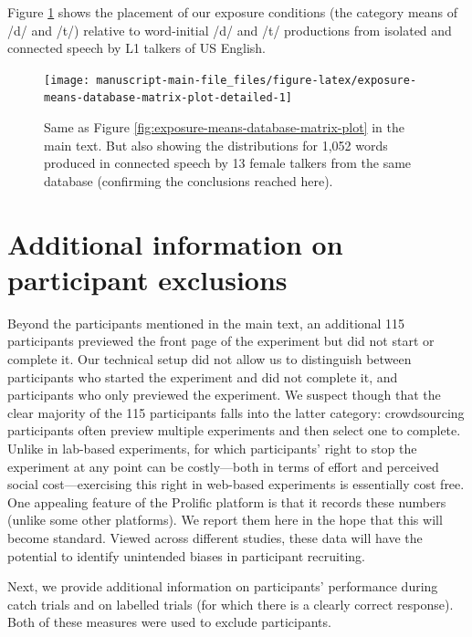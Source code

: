 \documentclass[
  11pt,
  man,mask,floatsintext]{apa6}
\begin{document}
Figure \ref{fig:exposure-means-database-matrix-plot-detailed} shows the placement of our exposure conditions (the category means of /d/ and /t/) relative to word-initial /d/ and /t/ productions from isolated and connected speech by L1 talkers of US English.



\begin{figure}[!ht]

{\centering \texttt{[image: manuscript-main-file\_files/figure-latex/exposure-means-database-matrix-plot-detailed-1]} 

}

\caption{Same as Figure \ref{fig:exposure-means-database-matrix-plot} in the main text. But also showing the distributions for 1,052 words produced in connected speech by 13 female talkers from the same database (confirming the conclusions reached here).}\label{fig:exposure-means-database-matrix-plot-detailed}
\end{figure}

\section{Additional information on participant exclusions}\label{sec:exclusions}

Beyond the participants mentioned in the main text, an additional 115 participants previewed the front page of the experiment but did not start or complete it. Our technical setup did not allow us to distinguish between participants who started the experiment and did not complete it, and participants who only previewed the experiment. We suspect though that the clear majority of the 115 participants falls into the latter category: crowdsourcing participants often preview multiple experiments and then select one to complete. Unlike in lab-based experiments, for which participants' right to stop the experiment at any point can be costly---both in terms of effort and perceived social cost---exercising this right in web-based experiments is essentially cost free. One appealing feature of the Prolific platform is that it records these numbers (unlike some other platforms). We report them here in the hope that this will become standard. Viewed across different studies, these data will have the potential to identify unintended biases in participant recruiting.

Next, we provide additional information on participants' performance during catch trials and on labelled trials (for which there is a clearly correct response). Both of these measures were used to exclude participants.
\end{document}
